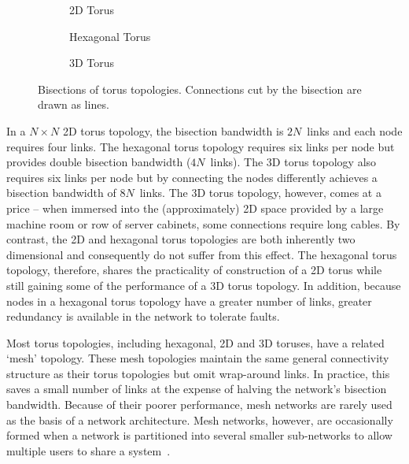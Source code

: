 		\begin{figure}
			\center
			\begin{subfigure}[b]{0.3\linewidth}
				\center
				
				\caption{2D Torus}
				\label{fig:bisection-bandwidth-2d}
			\end{subfigure}
			\begin{subfigure}[b]{0.3\linewidth}
				\center
				
				\caption{Hexagonal Torus}
				\label{fig:bisection-bandwidth-hex}
			\end{subfigure}
			\begin{subfigure}[b]{0.3\linewidth}
				\center
				
				\caption{3D Torus}
				\label{fig:bisection-bandwidth-3d}
			\end{subfigure}
			
			\caption[Bisections of torus topologies.]%
			{Bisections of torus topologies. Connections cut by the bisection
			are drawn as lines.}
			\label{fig:bisection-bandwidth}
		\end{figure}
		
		In a $N \times N$ 2D torus topology, the bisection bandwidth is $2N$~links
		and each node requires four links. The hexagonal torus topology requires
		six links per node but provides double bisection bandwidth ($4N$~links).
		The 3D torus topology also requires six links per node but by connecting
		the nodes differently achieves a bisection bandwidth of $8N$~links.  The 3D
		torus topology, however, comes at a price -- when immersed into the
		(approximately) 2D space provided by a large machine room or row of server
		cabinets, some connections require long cables. By contrast, the 2D and
		hexagonal torus topologies are both inherently two dimensional and
		consequently do not suffer from this effect. The hexagonal torus topology,
		therefore, shares the practicality of construction of a 2D torus while
		still gaining some of the performance of a 3D torus topology. In addition,
		because nodes in a hexagonal torus topology have a greater number of links,
		greater redundancy is available in the network to tolerate faults.
		
		Most torus topologies, including hexagonal, 2D and 3D toruses, have a
		related `mesh' topology. These mesh topologies maintain the same general
		connectivity structure as their torus topologies but omit wrap-around
		links. In practice, this saves a small number of links at the expense of
		halving the network's bisection bandwidth.  Because of their poorer
		performance, mesh networks are rarely used as the basis of a network
		architecture. Mesh networks, however, are occasionally formed when a
		network is partitioned into several smaller sub-networks to allow multiple
		users to share a system~\cite{spalloc16}.
		
